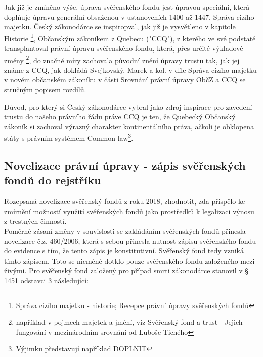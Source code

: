 \documentclass{article}
\begin{document}
Jak již je zmíněno výše, úprava svěřenského fondu jest úpravou speciální, která doplňuje úpravu generální obsaženou v ustanoveních 1400 až 1447, Správa cizího majetku. Český zákonodárce se inspiropval, jak již je vysvětleno v kapitole Historie \footnote{Správa cizího majetku - historie; Recepce právní úpravy svěřenských fondů}, Občanským zákoníkem z Quebecu ("CCQ"), z kterého ve své podstatě transplantoval právní úpravu svěřenského fondu, která, přes určité výkladové změny \footnote{například v pojmech majetek a jmění, viz Svěřenský fond a trust - Jejich fungování v mezinárodním srovnání od Luboše Tichého}, do značné míry zachovala původní znění úpravy trustu tak, jak jej známe z CCQ, jak dokládá Svejkovský, Marek a kol. v díle Správa cizího majetku v novém občanském zákoníku v části Srovnání právní úpravy ObčZ a CCQ se stručným popisem rozdílů. 

\newpage
\thispagestyle{smallertextinheader}

Důvod, pro který si Český zákonodárce vybral jako zdroj inspirace pro zavedení trustu do našeho právního řádu práve CCQ je ten, že Quebecký Občanský zákoník si zachoval výrazný charakter kontinentálního práva, ačkoli je obklopena státy s právním systémem Common law\footnote{Výjimku představují například DOPLNIT}.

\subsection{Novelizace právní úpravy - zápis svěřenských fondů do rejstříku}


Rozepsaná novelizace svěřenský fondů z roku 2018, zhodnotit, zda přispělo ke zmírnění možností využití svěřenských fondů jako prostředků k legalizaci výnosu z trestných činností.\\

Poměrně zásaní změny v souvislosti se zakládáním svěřenských fondů přinesla novelizace č.z. 460/2006, která s sebou přinesla nutnost zápisu svěřenského fondu do evidence s tím, že tento zápis je konstitutivní. Svěřenský fond tedy vzniká tímto zápisem. Toto se nicméně dotklo pouze svěřenského fondu založeného mezi živými. Pro svěřenský fond založený pro případ smrti zákonodárce stanovil v § 1451 odstavci 3 následující:\\
\end{document}
